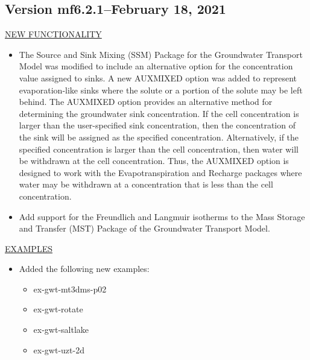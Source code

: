 	\subsection{Version mf6.2.1--February 18, 2021}

	\underline{NEW FUNCTIONALITY}
	\begin{itemize}
	        \item The Source and Sink Mixing (SSM) Package for the Groundwater Transport Model was modified to include an alternative option for the concentration value assigned to sinks.  A new AUXMIXED option was added to represent evaporation-like sinks where the solute or a portion of the solute may be left behind.  The AUXMIXED option provides an alternative method for determining the groundwater sink concentration.  If the cell concentration is larger than the user-specified sink concentration, then the concentration of the sink will be assigned as the specified concentration.  Alternatively, if the specified concentration is larger than the cell concentration, then water will be withdrawn at the cell concentration.  Thus, the AUXMIXED option is designed to work with the Evapotranspiration and Recharge packages where water may be withdrawn at a concentration that is less than the cell concentration.  
	        \item Add support for the Freundlich and Langmuir isotherms to the Mass Storage and Transfer (MST) Package of the Groundwater Transport Model.
	\end{itemize}
	
	\underline{EXAMPLES}
	\begin{itemize}
	        \item Added the following new examples: 
	        \begin{itemize}
	          \item ex-gwt-mt3dms-p02
	          \item ex-gwt-rotate
	          \item ex-gwt-saltlake
	          \item ex-gwt-uzt-2d
	        \end{itemize}
	\end{itemize}

